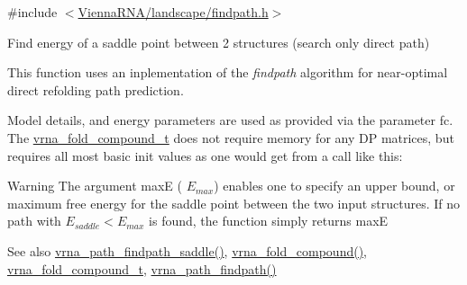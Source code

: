 {\ttfamily \#include $<$\mbox{\hyperlink{landscape_2findpath_8h}{Vienna\+R\+N\+A/landscape/findpath.\+h}}$>$}



Find energy of a saddle point between 2 structures (search only direct path) 

This function uses an inplementation of the {\itshape findpath} algorithm \cite{flamm:2001} for near-\/optimal direct refolding path prediction.

Model details, and energy parameters are used as provided via the parameter \textquotesingle{}fc\textquotesingle{}. The \mbox{\hyperlink{group__fold__compound_ga1b0cef17fd40466cef5968eaeeff6166}{vrna\+\_\+fold\+\_\+compound\+\_\+t}} does not require memory for any DP matrices, but requires all most basic init values as one would get from a call like this\+: 
\begin{DoxyCode}{0}
\end{DoxyCode}


\begin{DoxyWarning}{Warning}
The argument {\ttfamily maxE} ( $E_{max}$) enables one to specify an upper bound, or maximum free energy for the saddle point between the two input structures. If no path with $E_{saddle} < E_{max}$ is found, the function simply returns {\ttfamily maxE} 
\end{DoxyWarning}
\begin{DoxySeeAlso}{See also}
\mbox{\hyperlink{group__paths__direct_gad77dbfa125158f534147c0015a849bc3}{vrna\+\_\+path\+\_\+findpath\+\_\+saddle()}}, \mbox{\hyperlink{group__fold__compound_ga6601d994ba32b11511b36f68b08403be}{vrna\+\_\+fold\+\_\+compound()}}, \mbox{\hyperlink{group__fold__compound_ga1b0cef17fd40466cef5968eaeeff6166}{vrna\+\_\+fold\+\_\+compound\+\_\+t}}, \mbox{\hyperlink{group__paths__direct_ga2fed8ff126f5becd82cedd81a25c9bf0}{vrna\+\_\+path\+\_\+findpath()}}
\end{DoxySeeAlso}

